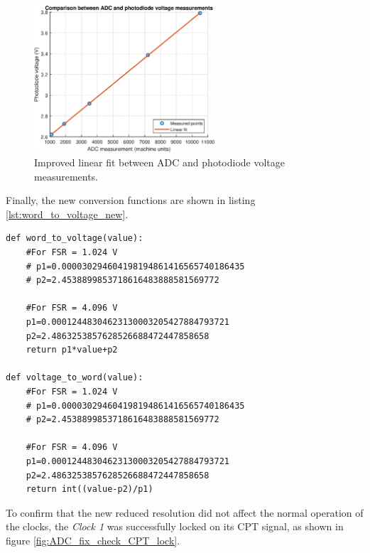 \documentclass[a4paper,12pt]{article}
\begin{document}
\begin{figure}[!h]
    \centering
    \includegraphics[width=0.6\textwidth]{Images/word_to_voltage_fsr_4.eps}
    \captionsetup{justification=centering}
    \caption{Improved linear fit between ADC and photodiode voltage measurements.} 
    \label{fig:word_to_volt_new}
\end{figure}

Finally, the new conversion functions are shown in listing \ref{lst:word_to_voltage_new}.

\begin{lstlisting}[style=python,label={lst:word_to_voltage_new},caption={Improved Python functions to convert machine units to voltage (file: misc.py).},firstnumber=151]
def word_to_voltage(value):
    #For FSR = 1.024 V
    # p1=0.000030294604198194861416565740186435
    # p2=2.4538899853718616483888581569772

    #For FSR = 4.096 V
    p1=0.00012448304623130003205427884793721
    p2=2.4863253857628526688472447858658
    return p1*value+p2
    
def voltage_to_word(value):
    #For FSR = 1.024 V
    # p1=0.000030294604198194861416565740186435
    # p2=2.4538899853718616483888581569772

    #For FSR = 4.096 V
    p1=0.00012448304623130003205427884793721
    p2=2.4863253857628526688472447858658
    return int((value-p2)/p1)
\end{lstlisting}

To confirm that the new reduced resolution did not affect the normal operation of the clocks, the \textit{Clock 1} was successfully locked on its CPT signal, as shown in figure \ref{fig:ADC_fix_check_CPT_lock}.
\end{document}
